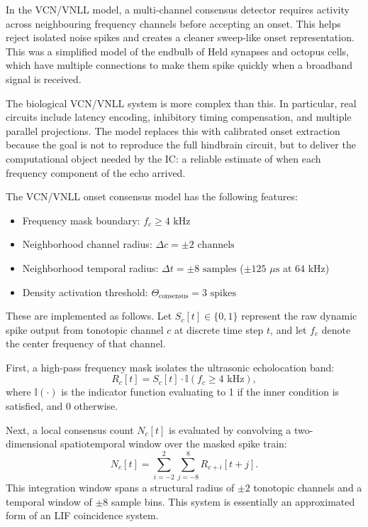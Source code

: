 In the VCN/VNLL model, a multi-channel consensus detector requires activity across neighbouring frequency channels before accepting an onset. This helps reject isolated noise spikes and creates a cleaner sweep-like onset representation. This was a simplified model of the endbulb of Held synapses and octopus cells, which have multiple connections to make them spike quickly when a broadband signal is received.

The biological VCN/VNLL system is more complex than this. In particular, real circuits include latency encoding, inhibitory timing compensation, and multiple parallel projections. The model replaces this with calibrated onset extraction because the goal is not to reproduce the full hindbrain circuit, but to deliver the computational object needed by the IC: a reliable estimate of when each frequency component of the echo arrived.

The VCN/VNLL onset consensus model has the following features:
\begin{itemize}
    \item Frequency mask boundary: $f_c \geq 4\text{~kHz}$
    \item Neighborhood channel radius: $\Delta c = \pm 2\text{~channels}$
    \item Neighborhood temporal radius: $\Delta t = \pm 8\text{~samples}$ ($\pm 125\text{~}\mu\text{s}$ at $64\text{~kHz}$)
    \item Density activation threshold: $\Theta_{\text{consensus}} = 3\text{~spikes}$
\end{itemize}

These are implemented as follows. Let $S_c[t] \in \{0,1\}$ represent the raw dynamic spike output from tonotopic channel $c$ at discrete time step $t$, and let $f_c$ denote the center frequency of that channel. 

First, a high-pass frequency mask isolates the ultrasonic echolocation band:
\begin{equation}
    R_c[t] = S_c[t] \cdot \mathbb{I}\left(f_c \geq 4\text{~kHz}\right),
\end{equation}
where $\mathbb{I}(\cdot)$ is the indicator function evaluating to 1 if the inner condition is satisfied, and 0 otherwise.

Next, a local consensus count $N_c[t]$ is evaluated by convolving a two-dimensional spatiotemporal window over the masked spike train:
\begin{equation}
    N_c[t] = \sum_{i=-2}^{2} \sum_{j=-8}^{8} R_{c+i}[t+j].
\end{equation}
This integration window spans a structural radius of $\pm 2$ tonotopic channels and a temporal window of $\pm 8$ sample bins. This system is essentially an approximated form of an LIF coincidence system.

